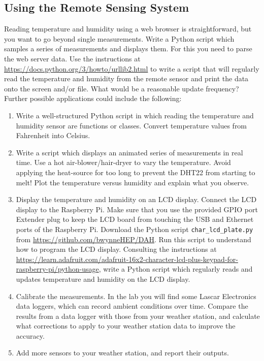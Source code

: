 \subsection{Using the Remote Sensing System}

Reading temperature and humidity using a web browser is straightforward, but you want to go beyond single measurements.
Write a Python script which samples a series of measurements and displays them.
For this you need to parse the web server data.
Use the instructions at \url{https://docs.python.org/3/howto/urllib2.html} to write a script that will regularly read the temperature and humidity from the remote sensor and print the data onto the screen and/or file.
What would be a reasonable update frequency?
Further possible applications could include the following:

\begin{enumerate}

\item Write a well-structured Python script in which reading the temperature and humidity sensor are functions or classes.
Convert temperature values from Fahrenheit into Celsius.

\item Write a script which displays an animated series of measurements in real time.
Use a hot air-blower/hair-dryer to vary the temperature.
Avoid applying the heat-source for too long to prevent the DHT22 from starting to melt!
Plot the temperature versus humidity and explain what you observe.
 
\item Display the temperature and humidity on an LCD display. 
Connect the LCD display to the Raspberry Pi. 
Make sure that you use the provided GPIO port Extender plug to keep the LCD board from touching the USB and Ethernet ports of the Raspberry Pi.
Download the Python script \texttt{char\_lcd\_plate.py} from \url{https://github.com/bwynneHEP/DAH}.
Run this script to understand how to program the LCD display.
Consulting the instructions at \url{https://learn.adafruit.com/adafruit-16x2-character-lcd-plus-keypad-for-raspberry-pi/python-usage}, write a Python script which regularly reads and updates temperature and humidity on the LCD display.

\item Calibrate the measurements.
In the lab you will find some Lascar Electronics data loggers, which can record ambient conditions over time.
Compare the results from a data logger with those from your weather station, and calculate what corrections to apply to your weather station data to improve the accuracy.

\item Add more sensors to your weather station, and report their outputs.

\end{enumerate}

